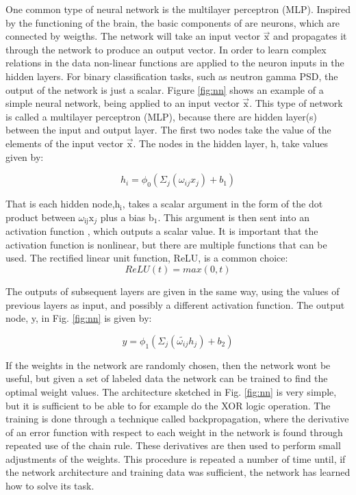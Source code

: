 \documentclass[main.tex]{subfiles}
\begin{document}
One common type of neural network is the multilayer perceptron (MLP). Inspired by the functioning of the brain, the basic components of are neurons, which are connected by weigths. The network will take an input vector $\vec{\textrm{x}}$ and propagates it through the network to produce an output vector. In order to learn complex relations in the data non-linear functions are applied to the neuron inputs in the hidden layers. For binary classification tasks, such as neutron gamma PSD, the output of the network is just a scalar. Figure \ref{fig:nn} shows an example of a simple neural network, being applied to an input vector $\vec{\textrm{x}}$. This type of network is called a multilayer perceptron (MLP), because there are hidden layer(s) between the input and output layer. The first two nodes take the value of the elements of the input vector $\vec{\textrm{x}}$. The nodes in the hidden layer, h, take values given by\cite{Goodfellow-et-al-2016}:

\begin{equation}
	h_i = \phi_0\left(\Sigma_j \left( \omega_{ij}x_j \right) + b_1\right)
\end{equation}

That is each hidden node,h$_\textrm{i}$,  takes a scalar argument in the form of the dot product between $\omega_\textrm{ij}\textrm{x}_{j}$ plus a bias b$_\textrm{1}$. This argument is then sent into an activation function \textphi, which outputs a scalar value. It is important that the activation function is nonlinear, but there are multiple functions that can be used. The rectified linear unit function, ReLU, is a common choice:
\begin{equation}
	ReLU(t) = max(0,t)
	\label{ReLU}
\end{equation}

The outputs of subsequent layers are given in the same way, using the values of previous layers as input, and possibly a different activation function. The output node, y, in Fig. \ref{fig:nn} is given by:

\begin{equation}
	y = \phi_1\left(\Sigma_j \left( \tilde{\omega_{ij}}h_j \right) + b_2\right)
\end{equation}

If the weights in the network are randomly chosen, then the network wont be useful, but given a set of labeled data the network can be trained to find the optimal weight values. The architecture sketched in Fig. \ref{fig:nn} is very simple, but it is sufficient to be able to for example do the XOR logic operation. The training is done through a technique called backpropagation, where the derivative of an error function with respect to each weight in the network is found through repeated use of the chain rule. These derivatives are then used to perform small adjustments of the weights. This procedure is repeated a number of time until, if the network architecture and training data was sufficient, the network has learned how to solve its task.
\end{document}
